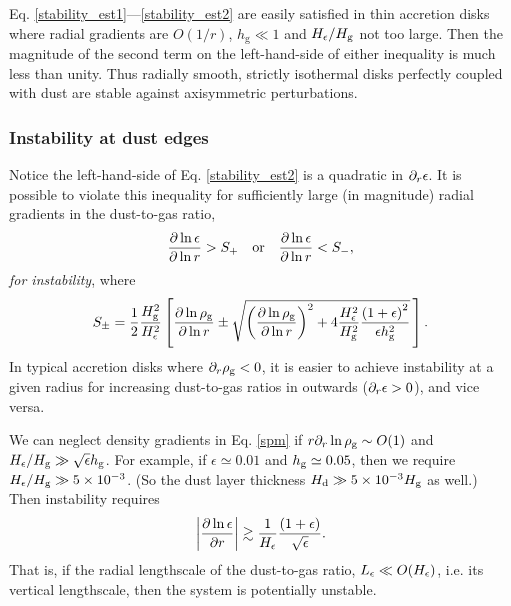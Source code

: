 Eq. \ref{stability_est1}---\ref{stability_est2} are easily satisfied
in thin accretion disks where radial gradients are $O(1/r)$, 
$h_\mathrm{g}\ll 1$ and $H_\epsilon/H_\mathrm{g}$ not too
large.  Then the
magnitude of the second term on the left-hand-side  of either
inequality is much less than unity. Thus radially smooth, strictly
isothermal disks perfectly coupled with dust are stable against
axisymmetric perturbations.  


\subsubsection{Instability at dust edges}
Notice the left-hand-side of Eq. \ref{stability_est2} is a quadratic in
$\partial_r\epsilon$. It is possible to
violate this inequality for sufficiently large (in magnitude) radial
gradients  in the dust-to-gas ratio, 
\begin{align}
  \frac{\partial\ln{\epsilon}}{\partial\ln{r}} > S_+ \quad \mathrm{or} \quad 
  \frac{\partial\ln{\epsilon}}{\partial\ln{r}} < S_-,
\end{align}
\emph{for instability}, where
\begin{align}\label{spm}
S_\pm = \frac{1}{2}\frac{H_\mathrm{g}^2}{H_\epsilon^2} 
  \left[
  \frac{\partial\ln{\rho_\mathrm{g}}}{\partial\ln{r}} \pm 
  \sqrt{
  \left(\frac{\partial\ln{\rho_\mathrm{g}}}{\partial\ln{r}}\right)^2 + 
  4 \frac{H_\epsilon^2}{H_\mathrm{g}^2}
  \frac{\left(1+\epsilon\right)^2}{\epsilon h_\mathrm{g}^2}
  }
  \,\right]. 
\end{align} 
In typical accretion disks where $\partial_r\rho_\mathrm{g}<0$, it is easier to
achieve instability at a given radius for increasing dust-to-gas
ratios in outwards ($\partial_r\epsilon > 0$), and vice versa.  

We can neglect density gradients in Eq. \ref{spm} 
if $r\partial_r\ln{\rho_\mathrm{g}}\sim O(1)$ and $H_\epsilon/H_\mathrm{g}\gg
\sqrt{\epsilon}h_\mathrm{g}$. For example, if $\epsilon\simeq 0.01$ and
$h_\mathrm{g}\simeq 0.05$, then we require $H_\epsilon/H_\mathrm{g}\gg
5\times10^{-3}$. (So the dust layer thickness $H_\mathrm{d}\gg 5
\times10^{-3}H_\mathrm{g}$ as well.) Then 
instability requires 
\begin{align}\label{dust_edge}
\left|\frac{\partial\ln{\epsilon}}{\partial r}\right| \gtrsim
  \frac{1}{H_\epsilon}\frac{\left(1+\epsilon\right)}{\sqrt{\epsilon}}.
\end{align}
That is, if the radial lengthscale of the dust-to-gas ratio,
$L_\epsilon\ll O(H_\epsilon)$, i.e. its vertical lengthscale,  
then the system is potentially unstable.  

